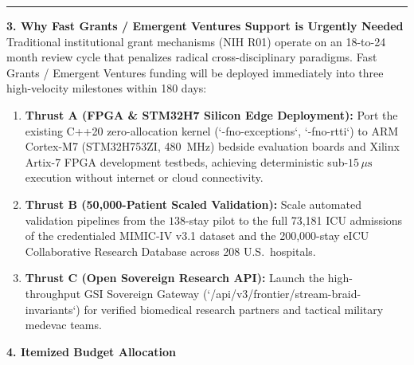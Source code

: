 \documentclass[11pt,letterpaper]{article}
\begin{document}
\vspace{2pt}\hrule\vspace{4pt}

\newpage

\noindent\textbf{3. Why Fast Grants / Emergent Ventures Support is Urgently Needed}\\
Traditional institutional grant mechanisms (NIH R01) operate on an 18-to-24 month review cycle that penalizes radical cross-disciplinary paradigms. Fast Grants / Emergent Ventures funding will be deployed immediately into three high-velocity milestones within 180 days:
\begin{enumerate}[noitemsep,topsep=1pt,leftmargin=*]
    \item \textbf{Thrust A (FPGA \& STM32H7 Silicon Edge Deployment):} Port the existing C++20 zero-allocation kernel (`-fno-exceptions`, `-fno-rtti`) to ARM Cortex-M7 (STM32H753ZI, 480~MHz) bedside evaluation boards and Xilinx Artix-7 FPGA development testbeds, achieving deterministic sub-$15\,\mu\text{s}$ execution without internet or cloud connectivity.
    \item \textbf{Thrust B (50,000-Patient Scaled Validation):} Scale automated validation pipelines from the $138$-stay pilot to the full 73,181 ICU admissions of the credentialed MIMIC-IV v3.1 dataset and the 200,000-stay eICU Collaborative Research Database across 208 U.S.\ hospitals.
    \item \textbf{Thrust C (Open Sovereign Research API):} Launch the high-throughput GSI Sovereign Gateway (`/api/v3/frontier/stream-braid-invariants`) for verified biomedical research partners and tactical military medevac teams.
\end{enumerate}

\vspace{4pt}
\noindent\textbf{4. Itemized Budget Allocation}
\end{document}
